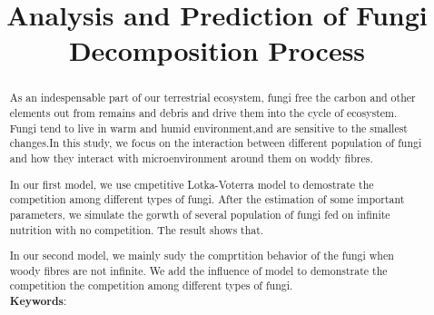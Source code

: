 \documentclass[12pt]{article}
\title{Analysis and Prediction of Fungi Decomposition Process}
\begin{document}
	\begin{abstract}
		As an indespensable part of our terrestrial ecosystem, fungi free the carbon and other elements out from remains and debris and drive them into the cycle of ecosystem. Fungi tend to live in warm and humid environment,and are sensitive to the smallest changes.In this study, we focus on the interaction between different population of fungi and how they interact with microenvironment around them on woddy fibres. 

		In our first model, we use cmpetitive Lotka-Voterra model to demostrate the competition among different types of fungi. After the estimation of some important parameters, we simulate the gorwth of several population of  fungi  fed on infinite nutrition with no competition. The result shows that.
		
		In our second model, we mainly sudy the comprtition behavior of the fungi when woody fibres are not infinite. We add the influence of model to demonstrate the competition the competition among different types of fungi. \\
		\vspace{5pt}
		\textbf{Keywords}:
	\end{abstract}
	
	\maketitle
	\tableofcontents
	
	
	
	
	
	
	
	
\end{document}
